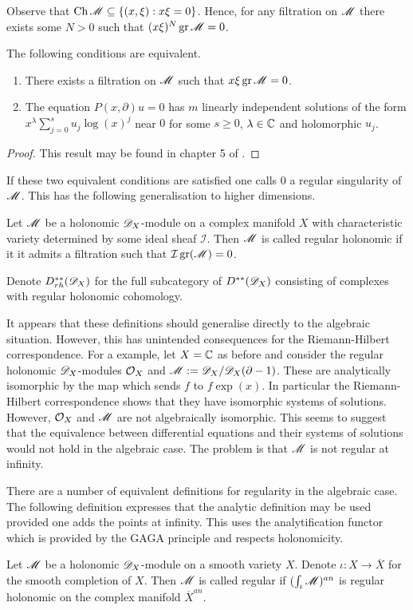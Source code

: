 Observe that $\operatorname{Ch} \mathscr{M}\subseteq \{(x,\xi): x\xi = 0\}$.
Hence, for any filtration on $\mathscr{M}$ there exists some $N>0$ such that
$(x\xi)^N \operatorname{gr}\mathscr{M} = 0 $.
\begin{proposition}
  The following conditions are equivalent.
  \begin{enumerate}
    \item There exists a filtration on $\mathscr{M}$ such that $x\xi\operatorname{gr}\mathscr{M} = 0$.
    \item The equation $P(x,\partial)u=0$ has $m$ linearly independent solutions of the form $x^\lambda \sum_{j=0}^s u_j \log(x)^j $
    near $0$ for some $s\geq 0$, $\lambda \in \mathbb{C}$ and holomorphic $u_j$.
  \end{enumerate}
\end{proposition}
\begin{proof}
  This result may be found in chapter 5 of \cite{kashiwara2003d}.
\end{proof}
If these two equivalent conditions are satisfied one calls $0$ a regular singularity of $\mathscr{M}$.
This has the following generalisation to higher dimensions.
\begin{definition}
   Let $\mathscr{M}$ be a holonomic $\mathscr{D}_X$-module on a complex manifold $X$ with characteristic variety determined by some ideal sheaf $\mathcal{I}$. Then $\mathscr{M}$ is called regular holonomic if it it admits a filtration such that $\mathcal{I} \operatorname{gr}(\mathscr{M}) = 0$.
\end{definition}
Denote $D^{**}_{rh}(\mathscr{D}_X)$ for the full subcategory of $D^{**}(\mathscr{D}_X)$ consisting of complexes with regular holonomic cohomology.

It appears that these definitions should generalise directly to the algebraic situation.
However, this has unintended consequences for the Riemann-Hilbert correspondence.
For a example, let $X = \mathbb{C}$ as before and consider the regular holonomic $\mathscr{D}_X$-modules $\mathcal{O}_X$ and $\mathscr{M} := \mathscr{D}_X/\mathscr{D}_X(\partial - 1)$.
These are analytically isomorphic by the map which sends $f$ to $f\exp(x)$.
In particular the Riemann-Hilbert correspondence shows that they have isomorphic systems of solutions.
However, $\mathcal{O}_X$ and $\mathscr{M}$ are not algebraically isomorphic.
This seems to suggest that the equivalence between differential equations and their systems of solutions would not hold in the algebraic case.
The problem is that $\mathscr{M}$ is not regular at infinity.

There are a number of equivalent definitions for regularity in the algebraic case.
The following definition expresses that the analytic definition may be used provided one adds the points at infinity.
This uses the analytification functor which is provided by the GAGA principle and respects holonomicity.
\begin{definition}
  Let $\mathscr{M}$ be a holonomic $\mathscr{D}_X$-module on a smooth variety $X$. Denote $\iota:X \to \overline{X}$ for the smooth completion of $X$. Then $\mathscr{M}$ is called regular if $(\int_\iota \mathscr{M})^{an}$ is regular holonomic on the complex manifold $\overline{X}^{an}$.
\end{definition}
